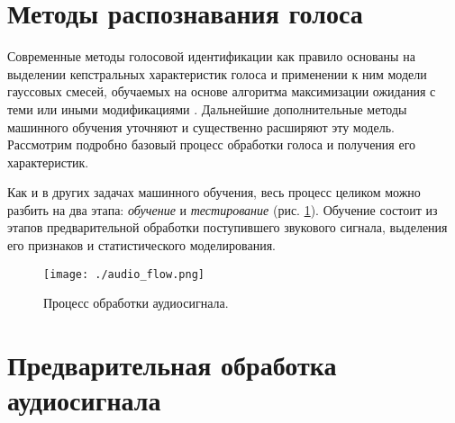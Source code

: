 \documentclass[12pt]{gost-7-32}
\begin{document}
\newpage
\section{Методы распознавания голоса}

Современные методы голосовой идентификации как правило основаны на выделении кепстральных характеристик голоса и применении к ним модели гауссовых смесей, обучаемых на основе алгоритма максимизации ожидания с теми или иными модификациями \cite{bai2021}.
Дальнейшие дополнительные методы машинного обучения уточняют и существенно расширяют эту модель.
Рассмотрим подробно базовый процесс обработки голоса и получения его характеристик.

Как и в других задачах машинного обучения, весь процесс целиком можно разбить на два этапа: \textit{обучение} и \textit{тестирование} (рис. \ref{fig:audio_flow}).
Обучение состоит из этапов предварительной обработки поступившего звукового сигнала, выделения его признаков и статистического моделирования.

\begin{figure}[h!]
    \centering
    \texttt{[image: ./audio\_flow.png]}
    \caption{Процесс обработки аудиосигнала.}
    \label{fig:audio_flow}
\end{figure}

\newpage
\section{Предварительная обработка аудиосигнала}
\end{document}
